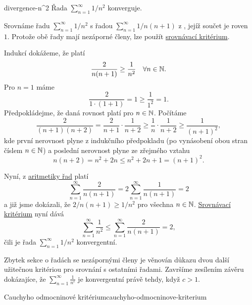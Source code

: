 \begin{lemma}{}{divergence-n^2}
 Řada $\sum_{n=1}^{\infty} 1 / n^2$ konverguje.
\end{lemma}
\begin{lemproof}
 Srovnáme řadu $\sum_{n=1}^{\infty} 1 / n^2$ s řadou $\sum_{n=1}^{\infty} 1 /
 n(n+1)$ z , jejíž součet
 je roven $1$. Protože obě řady mají nezáporné členy, lze použít
 \hyperref[prop:srovnavaci-kriterium]{srovnávací kritérium}.

 Indukcí dokážeme, že platí
 \[
  \frac{2}{n(n+1)} \geq \frac{1}{n^2} \quad \forall n \in \mathbb{N}.
 \]
 Pro $n = 1$ máme
 \[
  \frac{2}{1 \cdot (1 + 1)} = 1 \geq \frac{1}{1^2} = 1.
 \]
 Předpokládejme, že daná rovnost platí pro $n \in \mathbb{N}$. Počítáme
 \[
  \frac{2}{(n+1)(n+2)} = \frac{2}{n+1} \cdot \frac{1}{n+2} \geq \frac{1}{n}
  \cdot \frac{1}{n+2} \geq \frac{1}{(n+1)^2},
 \]
 kde první nerovnost plyne z indukčního předpokladu (po vynásobení obou stran
 číslem $n \in \mathbb{N}$) a poslední nerovnost plyne ze zřejmého vztahu
 \[
  n(n+2) = n^2 + 2n \leq n^2 + 2n + 1 = (n+1)^2.
 \]

 Nyní, z \hyperref[prop:aritmetika-ciselnych-rad]{aritmetiky řad} platí
 \[
  \sum_{n=1}^{\infty} \frac{2}{n(n+1)} = 2 \sum_{n=1}^{\infty} \frac{1}{n(n+1)}
  = 2
 \]
 a již jsme dokázali, že $2 / n(n+1) \geq 1 / n^2$ pro všechna $n \in \mathbb{N}$.
 \hyperref[prop:srovnavaci-kriterium]{Srovnávací kritérium} nyní dává
 \[
  \sum_{n=1}^{\infty} \frac{1}{n^2} \leq \sum_{n=1}^{\infty} \frac{2}{n(n+1)} =
  2,
 \]
 čili je řada $\sum_{n=1}^{\infty} 1 / n^2$ konvergentní.
\end{lemproof}

Zbytek sekce o řadách se nezápornými členy je věnován důkazu dvou další
užitečnou kritériou pro srovnání s ostatními řadami. Završíme zesílením závěru
 dokázajíce, že $\sum_{n=1}^{\infty}
\frac{1}{n^{c}}$ je konvergentní právě tehdy, když $c > 1$.

\begin{proposition}{Cauchyho odmocninové kritérium}{cauchyho-odmocninove-kriterium}
 
\end{proposition}
